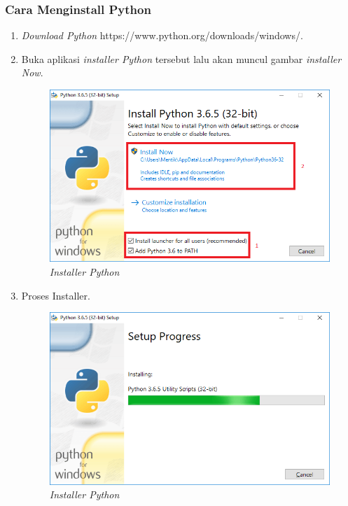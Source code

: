 \subsubsection{Cara Menginstall Python}
\par
\begin{enumerate}
    \item \textit{Download Python}
    https://www.python.org/downloads/windows/.
    \item Buka aplikasi \textit{installer Python} tersebut lalu akan muncul  gambar \textit{installer Now}.
    \begin{figure}[!htbp]
    \centering
    \includegraphics[scale=0.5]{figures/i.png}
    \caption{\textit{Installer Python}}
    \label{Figurepython}
    \end{figure}
\item Proses Installer.
     \begin{figure}[!htbp]
    \centering
    \includegraphics[scale=0.5]{figures/g.png}
    \caption{\textit{Installer Python}}

\end{figure}
\end{enumerate}
